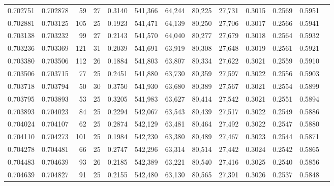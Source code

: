\begin{tabular}{rrrrrrrrrrrrr}
0.702751 & 0.702878 &    59 &  27 &                                     0.3140 & 541,366 &  64,244 &  80,225 &  27,731 & 0.3015 & 0.2569 & 0.5951 \\
0.702881 & 0.703125 &   105 &  25 &                                     0.1923 & 541,471 &  64,139 &  80,250 &  27,706 & 0.3017 & 0.2566 & 0.5941 \\
0.703138 & 0.703232 &    99 &  27 &                                     0.2143 & 541,570 &  64,040 &  80,277 &  27,679 & 0.3018 & 0.2564 & 0.5932 \\
0.703236 & 0.703369 &   121 &  31 &                                     0.2039 & 541,691 &  63,919 &  80,308 &  27,648 & 0.3019 & 0.2561 & 0.5921 \\
0.703380 & 0.703506 &   112 &  26 &                                     0.1884 & 541,803 &  63,807 &  80,334 &  27,622 & 0.3021 & 0.2559 & 0.5910 \\
0.703506 & 0.703715 &    77 &  25 &                                     0.2451 & 541,880 &  63,730 &  80,359 &  27,597 & 0.3022 & 0.2556 & 0.5903 \\
0.703718 & 0.703794 &    50 &  30 &                                     0.3750 & 541,930 &  63,680 &  80,389 &  27,567 & 0.3021 & 0.2554 & 0.5899 \\
0.703795 & 0.703893 &    53 &  25 &                                     0.3205 & 541,983 &  63,627 &  80,414 &  27,542 & 0.3021 & 0.2551 & 0.5894 \\
0.703893 & 0.704023 &    84 &  25 &                                     0.2294 & 542,067 &  63,543 &  80,439 &  27,517 & 0.3022 & 0.2549 & 0.5886 \\
0.704024 & 0.704107 &    62 &  25 &                                     0.2874 & 542,129 &  63,481 &  80,464 &  27,492 & 0.3022 & 0.2547 & 0.5880 \\
0.704110 & 0.704273 &   101 &  25 &                                     0.1984 & 542,230 &  63,380 &  80,489 &  27,467 & 0.3023 & 0.2544 & 0.5871 \\
0.704278 & 0.704481 &    66 &  25 &                                     0.2747 & 542,296 &  63,314 &  80,514 &  27,442 & 0.3024 & 0.2542 & 0.5865 \\
0.704483 & 0.704639 &    93 &  26 &                                     0.2185 & 542,389 &  63,221 &  80,540 &  27,416 & 0.3025 & 0.2540 & 0.5856 \\
0.704639 & 0.704827 &    91 &  25 &                                     0.2155 & 542,480 &  63,130 &  80,565 &  27,391 & 0.3026 & 0.2537 & 0.5848 \\

\end{tabular}
